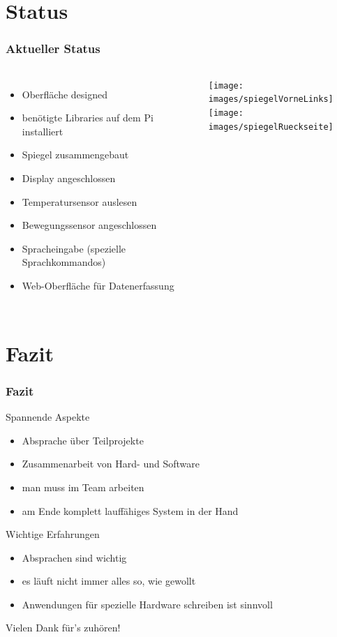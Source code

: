 \documentclass[11pt]{beamer}
\newcommand{\cmark}{\ding{51}}%
\newcommand{\xmark}{\ding{55}}%
\begin{document}
	\section{Status}
	\begin{frame}
		\frametitle{Aktueller Status}
			\begin{columns}
				\column{.5\paperwidth}
					\begin{itemize}
						\item[\cmark] Oberfl\"ache designed
						\item[\cmark] ben\"otigte Libraries auf dem Pi installiert
						\item[\cmark] Spiegel zusammengebaut
						\item[\cmark] Display angeschlossen
						\item[\cmark] Temperatursensor auslesen
						\item[\xmark] Bewegungssensor angeschlossen
						\item Spracheingabe (spezielle Sprachkommandos)
						\item Web-Oberfl\"ache f\"ur Datenerfassung
					\end{itemize}
				\column{.4\paperwidth}
					\texttt{[image: images/spiegelVorneLinks]}\\
					\vspace{.3cm}
					\texttt{[image: images/spiegelRueckseite]}
			\end{columns}
	\end{frame}
	
	\section{Fazit}
	\begin{frame}
		\frametitle{Fazit}
		\centering
		\begin{block}{Spannende Aspekte}
			\begin{itemize}
				\item Absprache \"uber Teilprojekte
				\item Zusammenarbeit von Hard- und Software
				\item man muss im Team arbeiten
				\item am Ende komplett lauff\"ahiges System in der Hand
			\end{itemize}
		\end{block}
		\pause
		\begin{block}{Wichtige Erfahrungen}
			\begin{itemize}
				\item Absprachen sind wichtig
				\item es l\"auft nicht immer alles so, wie gewollt
				\item Anwendungen f\"ur spezielle Hardware schreiben ist sinnvoll
			\end{itemize}
		\end{block}
	\end{frame}
	\begin{frame}
		\huge
		\begin{center}
			\vfill
			Vielen Dank für's zuhören!
			\vfill
		\end{center}
	\end{frame}
\end{document}
